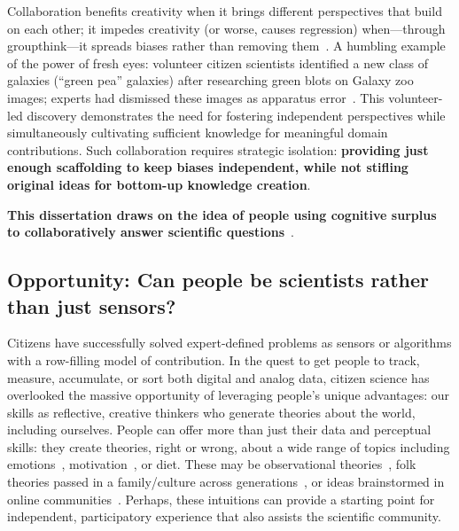 Collaboration benefits creativity when it brings different
 perspectives that build on each other; it impedes creativity (or worse, causes regression) 
when—through groupthink—it spreads biases rather than removing them~\cite{starbird2014rumors}. 
A humbling example of the power of fresh eyes: volunteer citizen scientists identified a new class of 
galaxies (“green pea” galaxies) after researching green blots on Galaxy zoo images; 
experts had dismissed these images as apparatus error~\cite{cardamone2009galaxy}.
This volunteer-led discovery demonstrates the need for fostering independent perspectives 
while simultaneously cultivating sufficient knowledge for meaningful domain contributions. 
Such collaboration requires strategic isolation: \textbf {providing just enough scaffolding to keep 
biases independent, while not stifling original ideas for bottom-up knowledge creation}.

\textbf{This dissertation 
draws on the idea of people using  cognitive surplus to collaboratively answer scientific questions}~\cite{Bonney2009}.



\subsection{Opportunity: Can people be scientists rather than just sensors?}
Citizens have successfully solved expert-defined problems as sensors or algorithms with a 
row-filling model of contribution.
In the quest to get people to track, measure, accumulate, or
sort both digital and analog data, citizen science has overlooked the massive 
opportunity of leveraging people’s unique advantages: our skills as reflective, 
creative thinkers who generate theories about the world, including ourselves.
People can offer more than just their data and perceptual
skills: they create theories, right or wrong, about a wide
range of topics including emotions~\cite{Johnson-Laird1992a}, motivation~\cite{Markus1991}, or
diet. These may be observational theories~\cite{Kempton1986}, folk theories
passed in a family/culture across generations~\cite{Gelman2011}, or ideas
brainstormed in online communities~\cite{23andme2016}. Perhaps, these intuitions 
can provide a starting point for independent, participatory experience that also assists the scientific community.

